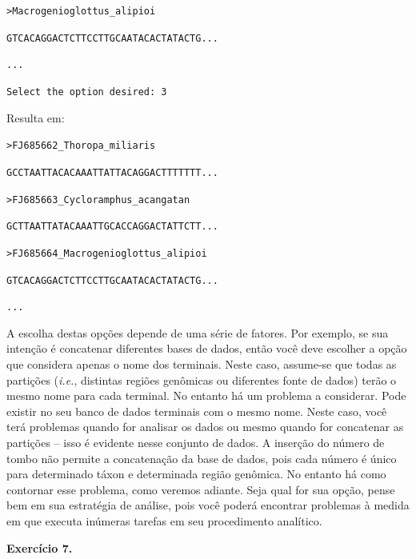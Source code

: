 \begin{refsection}
\noindent\texttt{>Macrogenioglottus\_alipioi}

\noindent\texttt{GTCACAGGACTCTTCCTTGCAATACACTATACTG...}

\noindent\texttt{...}\\

\normalsize

\texttt{Select the option desired: 3}

Resulta em:\\

\scriptsize

\noindent\texttt{>FJ685662\_Thoropa\_miliaris}

\noindent\texttt{GCCTAATTACACAAATTATTACAGGACTTTTTTT...}

\noindent\texttt{>FJ685663\_Cycloramphus\_acangatan}

\noindent\texttt{GCTTAATTATACAAATTGCACCAGGACTATTCTT...}

\noindent\texttt{>FJ685664\_Macrogenioglottus\_alipioi}

\noindent\texttt{GTCACAGGACTCTTCCTTGCAATACACTATACTG...}

\noindent\texttt{...}\\

\normalsize

A escolha destas opções depende de uma série de fatores. Por exemplo, se sua intenção é concatenar diferentes bases de dados, então você deve escolher a opção que considera apenas o nome dos terminais. Neste caso, assume-se que todas as partições (\textit{i.e.}, distintas regiões genômicas ou diferentes fonte de dados) terão o mesmo nome para cada terminal. No entanto há um problema a considerar. Pode existir no seu banco de dados terminais com o mesmo nome. Neste caso, você terá problemas quando for analisar os dados ou mesmo quando for concatenar as partições -- isso é evidente nesse conjunto de dados. A inserção do número de tombo não permite a concatenação da base de dados, pois cada número é único para determinado táxon e determinada região genômica. No entanto há como contornar esse problema, como veremos adiante. Seja qual for sua opção, pense bem em sua estratégia de análise, pois você poderá encontrar problemas à medida em que executa inúmeras tarefas em seu procedimento analítico.

\begin{blackBlock}{\textbf{Exercício 7.}}\label{tut7:ex:ex2}


\end{blackBlock}
\end{refsection}
